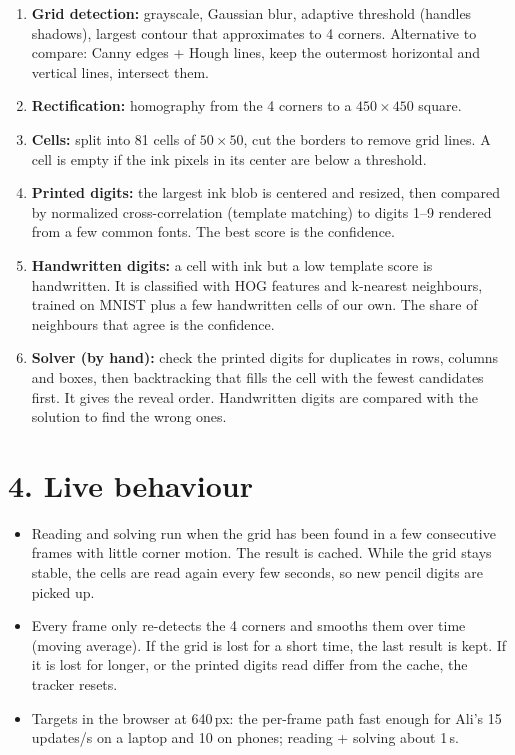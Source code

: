 \documentclass[10pt]{article}
\begin{document}
\begin{enumerate}
  \item \textbf{Grid detection:} grayscale, Gaussian blur, adaptive threshold (handles shadows),
        largest contour that approximates to 4 corners. Alternative to compare: Canny edges +
        Hough lines, keep the outermost horizontal and vertical lines, intersect them.
  \item \textbf{Rectification:} homography from the 4 corners to a $450\times450$ square.
  \item \textbf{Cells:} split into 81 cells of $50\times50$, cut the borders to remove grid
        lines. A cell is empty if the ink pixels in its center are below a threshold.
  \item \textbf{Printed digits:} the largest ink blob is centered and resized, then compared by
        normalized cross-correlation (template matching) to digits 1--9 rendered from a few
        common fonts. The best score is the confidence.
  \item \textbf{Handwritten digits:} a cell with ink but a low template score is handwritten. It
        is classified with HOG features and k-nearest neighbours, trained on MNIST plus a few
        handwritten cells of our own. The share of neighbours that agree is the confidence.
  \item \textbf{Solver (by hand):} check the printed digits for duplicates in rows, columns and
        boxes, then backtracking that fills the cell with the fewest candidates first. It gives
        the reveal order. Handwritten digits are compared with the solution to find the wrong ones.
\end{enumerate}

\section*{4. Live behaviour}

\begin{itemize}
  \item Reading and solving run when the grid has been found in a few consecutive frames with
        little corner motion. The result is cached. While the grid stays stable, the cells are
        read again every few seconds, so new pencil digits are picked up.
  \item Every frame only re-detects the 4 corners and smooths them over time (moving average).
        If the grid is lost for a short time, the last result is kept. If it is lost for longer,
        or the printed digits read differ from the cache, the tracker resets.
  \item Targets in the browser at 640\,px: the per-frame path fast enough for Ali's 15 updates/s
        on a laptop and 10 on phones; reading + solving about 1\,s.
\end{itemize}
\end{document}
